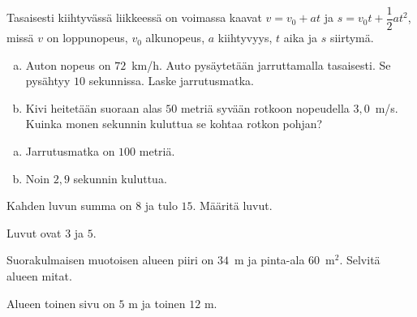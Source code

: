 \begin{tehtavasivu}
\begin{tehtava}
    Tasaisesti kiihtyvässä liikkeessä on voimassa kaavat $v = v_0 + at$ ja $s = v_0t + \dfrac{1}{2}at^2$, missä $v$ on loppunopeus, $v_0$ alkunopeus, $a$ kiihtyvyys, $t$ aika ja $s$ siirtymä.
		\begin{enumerate}[a)]
            \item Auton nopeus on $72$~km/h. Auto pysäytetään jarruttamalla tasaisesti. Se pysähtyy $10$ sekunnissa. Laske jarrutusmatka.
            \item Kivi heitetään suoraan alas $50$ metriä syvään rotkoon nopeudella $3,0$~m/s. Kuinka monen sekunnin kuluttua se kohtaa rotkon pohjan?
        \end{enumerate}
    \begin{vastaus}
        \begin{enumerate}[a)]
            \item Jarrutusmatka on $100$ metriä.
            \item Noin $2,9$ sekunnin kuluttua.
        \end{enumerate}
    \end{vastaus}
\end{tehtava}

\begin{tehtava}
    Kahden luvun summa on $8$ ja tulo $15$. Määritä luvut.
    \begin{vastaus}
		Luvut ovat $3$ ja $5$.
    \end{vastaus}
\end{tehtava}

\begin{tehtava}
    Suorakulmaisen muotoisen alueen piiri on $34$~m ja pinta-ala $60$~m$^2$. Selvitä alueen mitat.
    \begin{vastaus}
		Alueen toinen sivu on $5$ m ja toinen $12$ m.
    \end{vastaus}
\end{tehtava}


\end{tehtavasivu}
